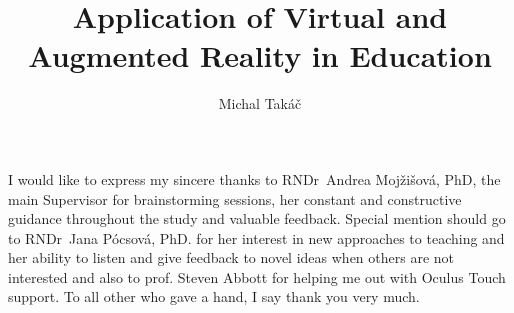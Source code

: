 \documentclass[]{tukethesis}
\author{Michal Takáč}
\title{Application of Virtual and Augmented Reality in Education}
\subtitle{}
\begin{document}
\renewcommand\theHfigure{\theHsection.\arabic{figure}}
\renewcommand\theHtable{\theHsection.\arabic{table}}

\firstpage

\titlepage


%
%

\abstrakte %


\endabstract %

\assignthesis

\declaration

\acknowledgement %
I would like to express my sincere thanks to RNDr~Andrea
Mojžišová, PhD, the main Supervisor for brainstorming sessions, her constant and constructive guidance throughout the study and valuable feedback. Special mention should go
to RNDr~Jana Pócsová, PhD. for her interest in new approaches to teaching and her ability to listen and give feedback to novel ideas when others are not interested and also to prof. Steven Abbott for helping me out with Oculus Touch support. To all other who gave a hand, I say thank you
very much.
\endacknowledgement
\end{document}
